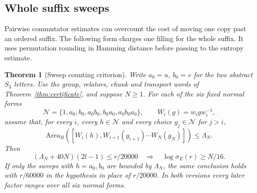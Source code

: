 \documentclass[11pt,a4paper]{article}
\theoremstyle{plain}
\newtheorem{theorem}{Theorem}[section]
\theoremstyle{definition}
\theoremstyle{remark}
\begin{document}
\subsection{Whole suffix sweeps}

Pairwise commutator estimates can overcount the cost of moving one copy past an ordered suffix. The following form charges one filling
for the whole suffix. It uses permutation rounding in Hamming distance before passing to the entropy estimate.

\begin{theorem}[Sweep counting criterion]\label{thm:sweep}
Write $a_0=u$, $b_0=v$ for the two abstract $S_3$ letters. Use the group, relators, chunk and transport words of Theorem~\ref{thm:certificate}, and suppose $N\ge1$.
For each of the six fixed normal forms
\[
\mathcal N=\{1,a_0,b_0,a_0b_0,b_0a_0,a_0b_0a_0\},\qquad W_i(g)=w_i g w_i^{-1},
\]
assume that, for every $i$, every $h\in\mathcal N$ and every choice $g_j\in\mathcal N$ for $j>i$,
\[
\mathrm{Area}_R\left([W_i(h),W_{i+1}(g_{i+1})\cdots W_N(g_N)]\right)\le\Lambda_N.
\]
Then
\begin{equation}\label{eq:sweep-criterion}
 (\Lambda_N+40N)(2l-1)\le r/20000
 \quad\Longrightarrow\quad \log\sigma_E(r)\ge N/16.
\end{equation}
If only the sweeps with $h=a_0,b_0$ are bounded by $\Lambda_N$, the same conclusion holds with $r/60000$ in the
hypothesis in place of $r/20000$. In both versions every later factor ranges over all six normal forms.
\end{theorem}
\end{document}
